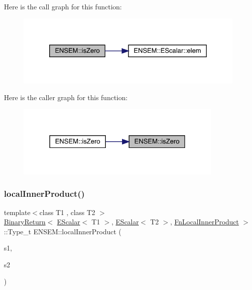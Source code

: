 Here is the call graph for this function\+:
\nopagebreak
\begin{figure}[H]
\begin{center}
\leavevmode
\includegraphics[width=320pt]{d4/dca/group__escalar_ga114fe2eec1be253ca86ecb5290d189fc_cgraph}
\end{center}
\end{figure}
Here is the caller graph for this function\+:
\nopagebreak
\begin{figure}[H]
\begin{center}
\leavevmode
\includegraphics[width=286pt]{d4/dca/group__escalar_ga114fe2eec1be253ca86ecb5290d189fc_icgraph}
\end{center}
\end{figure}
\mbox{\label{group__escalar_ga0013b1f4312c45e970912e4df1f55f65}} 
\subsubsection{\texorpdfstring{localInnerProduct()}{localInnerProduct()}}
{\footnotesize\ttfamily template$<$class T1 , class T2 $>$ \\
\mbox{\hyperlink{structENSEM_1_1BinaryReturn}{Binary\+Return}}$<$ \mbox{\hyperlink{classENSEM_1_1EScalar}{E\+Scalar}}$<$ T1 $>$, \mbox{\hyperlink{classENSEM_1_1EScalar}{E\+Scalar}}$<$ T2 $>$, \mbox{\hyperlink{structENSEM_1_1FnLocalInnerProduct}{Fn\+Local\+Inner\+Product}} $>$\+::Type\+\_\+t E\+N\+S\+E\+M\+::local\+Inner\+Product (\begin{DoxyParamCaption}\item[{const \mbox{\hyperlink{classENSEM_1_1EScalar}{E\+Scalar}}$<$ T1 $>$ \&}]{s1,  }\item[{const \mbox{\hyperlink{classENSEM_1_1EScalar}{E\+Scalar}}$<$ T2 $>$ \&}]{s2 }\end{DoxyParamCaption})\hspace{0.3cm}{\ttfamily [inline]}}

